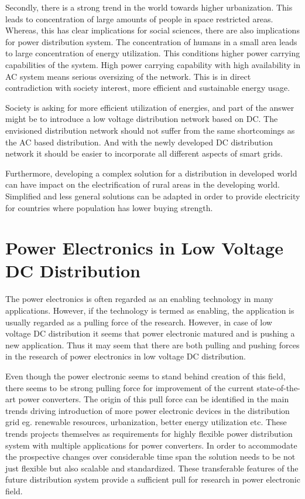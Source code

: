 \documentclass[]{scrreprt}
\begin{document}
Secondly, there is a strong trend in the world towards higher urbanization. This leads to concentration of large amounts of people in space restricted areas. Whereas, this has clear implications for social sciences, there are also implications for power distribution system. The concentration of humans in a small area leads to large concentration of energy utilization. This conditions higher power carrying capabilities of the system. High power carrying capability with high availability in AC system means serious oversizing of the network. This is in direct contradiction with  society interest, more efficient and sustainable energy usage. 

Society is asking for more efficient utilization of energies,  and part of the answer might be to introduce a low voltage distribution network based on DC. The envisioned distribution network should not suffer from the same shortcomings as the AC based distribution. And with the newly developed DC distribution network it should be easier to incorporate all different aspects of smart grids. 

Furthermore, developing a complex solution for a distribution in developed world can have impact on the electrification of rural areas in the developing world. Simplified and less general solutions can be adapted in order to provide electricity for countries where population has lower buying strength.

\section{Power Electronics in Low Voltage DC Distribution}

The power electronics is often regarded as an enabling technology in many applications. However, if the technology is termed as enabling, the application is usually regarded as a pulling force of the research. However, in case of low voltage DC distribution it seems that power electronic matured and is pushing a new application. Thus it may seem that there are both pulling and pushing forces in the research of power electronics in low voltage DC distribution.

Even though the power electronic seems to stand behind creation of this field, there seems to be strong pulling force for improvement of the current state-of-the-art power converters. The origin of this pull force can be identified in the main trends driving introduction of more power electronic devices in the distribution grid eg. renewable resources, urbanization, better energy utilization etc. These trends projects themselves as requirements for highly flexible power distribution system with multiple applications for power converters. In order to accommodate the prospective changes over considerable time span the solution needs to be not just flexible but also scalable and standardized. These transferable features of the future distribution system provide a sufficient pull for research in power electronic field.
\end{document}
